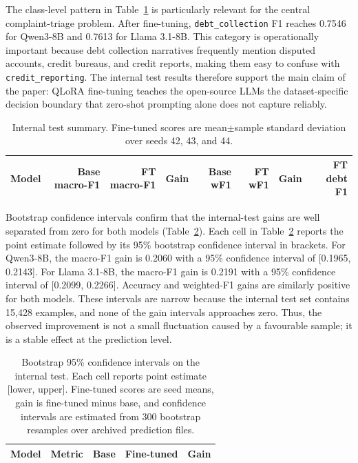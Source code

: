 \documentclass{elektr}
\begin{document}
The class-level pattern in Table~\ref{tab:internal-summary} is particularly relevant for the central complaint-triage problem. After fine-tuning, \texttt{debt\_collection} F1 reaches 0.7546 for Qwen3-8B and 0.7613 for Llama 3.1-8B. This category is operationally important because debt collection narratives frequently mention disputed accounts, credit bureaus, and credit reports, making them easy to confuse with \texttt{credit\_reporting}. The internal test results therefore support the main claim of the paper: QLoRA fine-tuning teaches the open-source LLMs the dataset-specific decision boundary that zero-shot prompting alone does not capture reliably.

\begin{table}[h!]
\caption{Internal test summary. Fine-tuned scores are mean$\pm$sample standard deviation over seeds 42, 43, and 44.}
\label{tab:internal-summary}
\begin{center}
\footnotesize
\begin{tabular*}{\textwidth}{@{\extracolsep{\fill}}lrrrrrrr}
\hline
Model & Base macro-F1 & FT macro-F1 & Gain & Base wF1 & FT wF1 & Gain & FT debt F1\\
\hline

\end{tabular*}
\end{center}
\end{table}

Bootstrap confidence intervals confirm that the internal-test gains are well separated from zero for both models (Table~\ref{tab:bootstrap-ci}). Each cell in Table~\ref{tab:bootstrap-ci} reports the point estimate followed by its 95\% bootstrap confidence interval in brackets. For Qwen3-8B, the macro-F1 gain is 0.2060 with a 95\% confidence interval of [0.1965, 0.2143]. For Llama 3.1-8B, the macro-F1 gain is 0.2191 with a 95\% confidence interval of [0.2099, 0.2266]. Accuracy and weighted-F1 gains are similarly positive for both models. These intervals are narrow because the internal test set contains 15,428 examples, and none of the gain intervals approaches zero. Thus, the observed improvement is not a small fluctuation caused by a favourable sample; it is a stable effect at the prediction level.

\begin{table}[h!]
\caption{Bootstrap 95\% confidence intervals on the internal test. Each cell reports point estimate [lower, upper]. Fine-tuned scores are seed means, gain is fine-tuned minus base, and confidence intervals are estimated from 300 bootstrap resamples over archived prediction files.}
\label{tab:bootstrap-ci}
\begin{center}
\begin{tabular}{llrrr}
\hline
Model & Metric & Base & Fine-tuned & Gain\\
\hline

\end{tabular}
\end{center}
\end{table}
\end{document}
